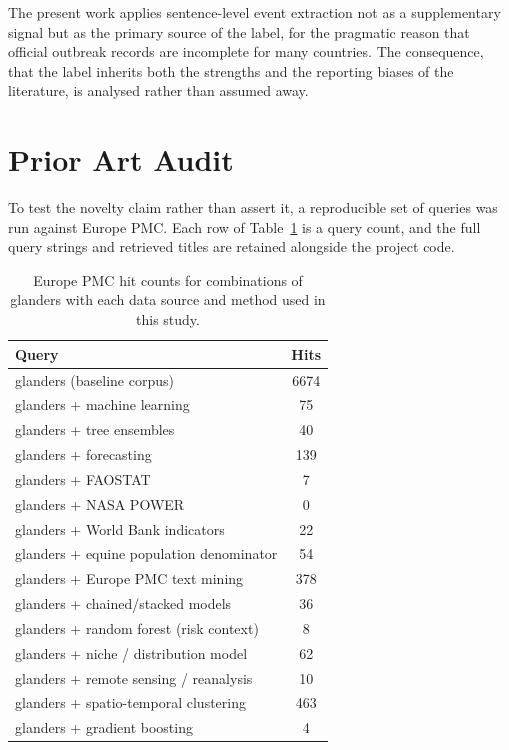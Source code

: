 \documentclass[10pt,openany]{report}
\begin{document}
The present work applies sentence-level event extraction not as a supplementary signal but as the
primary source of the label, for the pragmatic reason that official outbreak records are
incomplete for many countries. The consequence, that the label inherits both the strengths and
the reporting biases of the literature, is analysed rather than assumed away.

\section{Prior Art Audit}

To test the novelty claim rather than assert it, a reproducible set of queries was run against
Europe PMC. Each row of Table~\ref{tab:novelty} is a query count, and the full query strings and
retrieved titles are retained alongside the project code.

\begin{table}[htbp]
\centering
\caption{Europe PMC hit counts for combinations of glanders with each data source and method used
in this study.}
\label{tab:novelty}
\small
\begin{tabular}{@{}lc@{}}
\toprule
\textbf{Query} & \textbf{Hits} \\
\midrule
glanders (baseline corpus) & 6674 \\
glanders + machine learning & 75 \\
glanders + tree ensembles & 40 \\
glanders + forecasting & 139 \\
glanders + FAOSTAT & 7 \\
glanders + NASA POWER & 0 \\
glanders + World Bank indicators & 22 \\
glanders + equine population denominator & 54 \\
glanders + Europe PMC text mining & 378 \\
glanders + chained/stacked models & 36 \\
glanders + random forest (risk context) & 8 \\
glanders + niche / distribution model & 62 \\
glanders + remote sensing / reanalysis & 10 \\
glanders + spatio-temporal clustering & 463 \\
glanders + gradient boosting & 4 \\
\bottomrule
\end{tabular}
\end{table}
\end{document}
